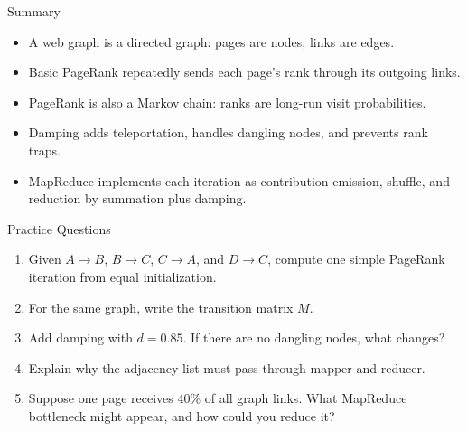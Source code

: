 \documentclass[aspectratio=169,11pt]{beamer}
\begin{document}
\begin{frame}{Summary}
\begin{itemize}
  \item A web graph is a directed graph: pages are nodes, links are edges.
  \item Basic PageRank repeatedly sends each page's rank through its outgoing links.
  \item PageRank is also a Markov chain: ranks are long-run visit probabilities.
  \item Damping adds teleportation, handles dangling nodes, and prevents rank traps.
  \item MapReduce implements each iteration as contribution emission, shuffle,
  and reduction by summation plus damping.
\end{itemize}
\end{frame}

\begin{frame}{Practice Questions}
\begin{enumerate}
  \item Given \(A\rightarrow B\), \(B\rightarrow C\), \(C\rightarrow A\), and
  \(D\rightarrow C\), compute one simple PageRank iteration from equal initialization.
  \item For the same graph, write the transition matrix \(M\).
  \item Add damping with \(d=0.85\). If there are no dangling nodes, what changes?
  \item Explain why the adjacency list must pass through mapper and reducer.
  \item Suppose one page receives \(40\%\) of all graph links. What MapReduce
  bottleneck might appear, and how could you reduce it?
\end{enumerate}
\end{frame}
\end{document}

